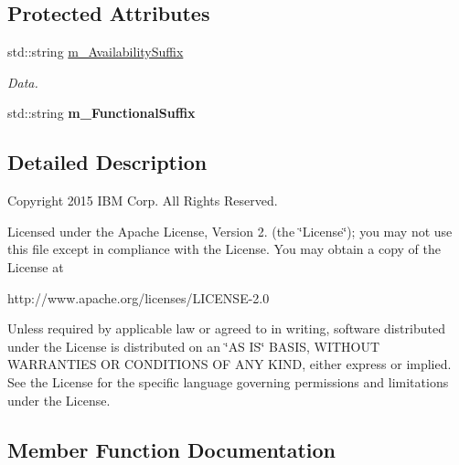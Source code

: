 \subsection*{Protected Attributes}
\begin{DoxyCompactItemize}
\item 
\mbox{\label{class_u_r_l_service_ab9e42ade42f203264d7a55d3931f6f00}} 
std\+::string \hyperlink{class_u_r_l_service_ab9e42ade42f203264d7a55d3931f6f00}{m\+\_\+\+Availability\+Suffix}
\begin{DoxyCompactList}\small\item\em Data. \end{DoxyCompactList}\item 
\mbox{\label{class_u_r_l_service_a8fc0eb442467202e5a306173fdaacc19}} 
std\+::string {\bfseries m\+\_\+\+Functional\+Suffix}
\end{DoxyCompactItemize}


\subsection{Detailed Description}
Copyright 2015 I\+BM Corp. All Rights Reserved.

Licensed under the Apache License, Version 2. (the \char`\"{}\+License\char`\"{}); you may not use this file except in compliance with the License. You may obtain a copy of the License at \begin{DoxyVerb} http://www.apache.org/licenses/LICENSE-2.0
\end{DoxyVerb}


Unless required by applicable law or agreed to in writing, software distributed under the License is distributed on an \char`\"{}\+A\+S I\+S\char`\"{} B\+A\+S\+IS, W\+I\+T\+H\+O\+UT W\+A\+R\+R\+A\+N\+T\+I\+ES OR C\+O\+N\+D\+I\+T\+I\+O\+NS OF A\+NY K\+I\+ND, either express or implied. See the License for the specific language governing permissions and limitations under the License. 

\subsection{Member Function Documentation}
\mbox{\label{class_u_r_l_service_ac2ce83dbbbe8452d8952f82efd4f88bb}} 
